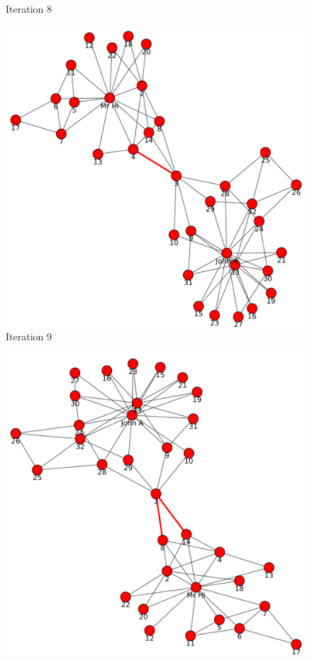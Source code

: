 \begin{itemize}
\begin{figure}[h!]
\begin{center}
\caption{Iteration 8}
\label{fig:q1fig8}
\end{center}
\end{figure}
\newpage
\begin{figure}[h!]
\begin{center}
\includegraphics[scale=0.55, keepaspectratio=true]{figures/graphs/EdgeHighlightedGraph9.pdf}
\caption{Iteration 9}
\label{fig:q1fig9}
\end{center}
\end{figure}
\newpage
\begin{figure}[h!]
\begin{center}
\includegraphics[scale=0.55, keepaspectratio=true]{figures/graphs/EdgeHighlightedGraph10.pdf}

\end{center}
\end{figure}
\end{itemize}
